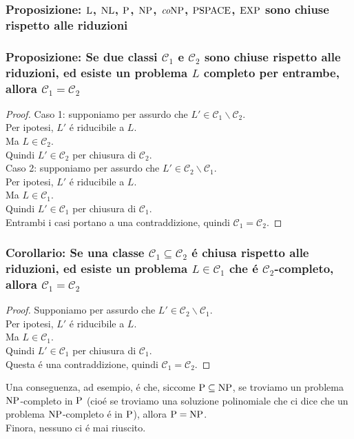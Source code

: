 \subsubsection{Proposizione: $\L$, $\NL$, $\P$, $\NP$, $\co\NP$, $\PSPACE$, $\EXP$ sono chiuse rispetto alle riduzioni}

\subsubsection{Proposizione: Se due classi $\mathcal{C}_1$ e $\mathcal{C}_2$ sono chiuse rispetto alle riduzioni, ed esiste un problema $L$ completo per entrambe, allora $\mathcal{C}_1 = \mathcal{C}_2$}
\label{proposizione:classi_chiuse_riduzioni_completo}
\begin{proof}
Caso 1: supponiamo per assurdo che $L' \in \mathcal{C}_1 \smallsetminus \mathcal{C}_2$. \\
Per ipotesi, $L'$ é riducibile a $L$. \\
Ma $L \in \mathcal{C}_2$.\\
Quindi $L' \in \mathcal{C}_2$ per chiusura di $\mathcal{C}_2$.\\

Caso 2: supponiamo per assurdo che $L' \in \mathcal{C}_2 \smallsetminus \mathcal{C}_1$. \\
Per ipotesi, $L'$ é riducibile a $L$. \\
Ma $L \in \mathcal{C}_1$.\\
Quindi $L' \in \mathcal{C}_1$ per chiusura di $\mathcal{C}_1$.\\

Entrambi i casi portano a una contraddizione, quindi $\mathcal{C}_1 = \mathcal{C}_2$.
\end{proof}

\subsubsection{Corollario: Se una classe $\mathcal{C}_1 \subseteq \mathcal{C}_2$ é chiusa rispetto alle riduzioni, ed esiste un problema $L \in \mathcal{C}_1$ che é $\mathcal{C}_2$-completo, allora $\mathcal{C}_1 = \mathcal{C}_2$}
\begin{proof}
Supponiamo per assurdo che $L' \in \mathcal{C}_2 \smallsetminus \mathcal{C}_1$. \\
Per ipotesi, $L'$ é riducibile a $L$. \\
Ma $L \in \mathcal{C}_1$.\\
Quindi $L' \in \mathcal{C}_1$ per chiusura di $\mathcal{C}_1$.\\
Questa é una contraddizione, quindi $\mathcal{C}_1 = \mathcal{C}_2$.
\end{proof}
Una conseguenza, ad esempio, é che, siccome $\P \subseteq \NP$, se troviamo un problema $\NP$-completo in $\P$ (cioé se troviamo una soluzione polinomiale che ci dice che un problema $\NP$-completo é in $\P$), allora $\P = \NP$. \\
Finora, nessuno ci é mai riuscito.